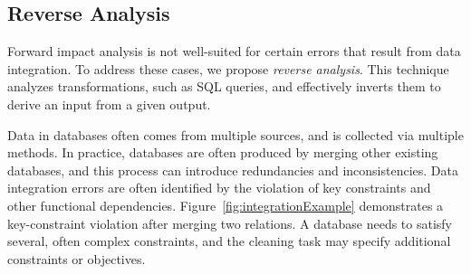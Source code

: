 


\subsection{Reverse Analysis} %
\label{sub:reverse_analysis}
Forward impact analysis is not well-suited for certain errors that
result from data integration. To address these cases, we propose \emph{reverse analysis}. This technique analyzes transformations, such as SQL queries, and effectively inverts them to derive an input from a given output.

Data in databases often comes from multiple
sources, and is collected via multiple methods. In practice, databases are
often produced by merging other existing databases, and this process can
introduce redundancies and inconsistencies. Data integration errors are often identified by the violation of key constraints and other functional dependencies. Figure~\ref{fig:integrationExample} demonstrates a key-constraint violation after merging two relations. A database needs to satisfy several, often complex constraints, and the cleaning task may specify additional constraints or objectives.

